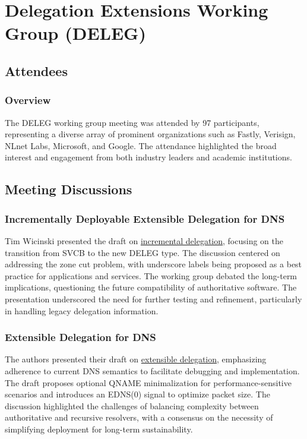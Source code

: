 \documentclass{article}
\begin{document}
\newpage

\section{Delegation Extensions Working Group (DELEG)}

\subsection{Attendees}
\subsubsection{Overview}
The DELEG working group meeting was attended by 97 participants, representing a diverse array of prominent organizations such as Fastly, Verisign, NLnet Labs, Microsoft, and Google. The attendance highlighted the broad interest and engagement from both industry leaders and academic institutions.

\subsection{Meeting Discussions}

\subsubsection{Incrementally Deployable Extensible Delegation for DNS}
Tim Wicinski presented the draft on \href{https://datatracker.ietf.org/doc/html/draft-homburg-deleg-incremental-deleg}{incremental delegation}, focusing on the transition from SVCB to the new DELEG type. The discussion centered on addressing the zone cut problem, with underscore labels being proposed as a best practice for applications and services. The working group debated the long-term implications, questioning the future compatibility of authoritative software. The presentation underscored the need for further testing and refinement, particularly in handling legacy delegation information.

\subsubsection{Extensible Delegation for DNS}
The authors presented their draft on \href{https://datatracker.ietf.org/doc/html/draft-wesplaap-deleg}{extensible delegation}, emphasizing adherence to current DNS semantics to facilitate debugging and implementation. The draft proposes optional QNAME minimalization for performance-sensitive scenarios and introduces an EDNS(0) signal to optimize packet size. The discussion highlighted the challenges of balancing complexity between authoritative and recursive resolvers, with a consensus on the necessity of simplifying deployment for long-term sustainability.
\end{document}
